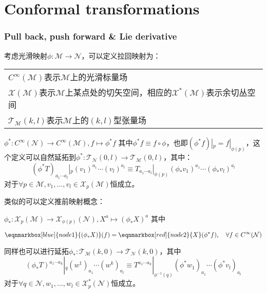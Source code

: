 \part{Conformal transformations}
\section{Pull back, push forward \& Lie derivative}
考虑光滑映射$\phi:\mathcal{M}\to\mathcal{N}$，可以定义拉回映射为：
\begin{margintable}\footnotesize 
	\begin{tabularx}{\marginparwidth}{|X}
		$C^{\infty}(\mathcal{M})$表示$\mathcal{M}$上的光滑标量场\\
		$\mathscr{X}(\mathcal{M})$表示$\mathcal{M}$上某点处的切矢空间，相应的$\mathscr{X}^*(\mathcal{M})$表示余切丛空间\\
		$\mathscr{T}_\mathcal{M}(k,l)$表示$\mathcal{M}$上的$(k,l)$型张量场
	\end{tabularx}
\end{margintable}
\begin{definition}
	$\phi^*: C^{\infty}(\mathcal{N})\to C^{\infty}(\mathcal{M}),f\mapsto \phi^*f$
	其中$\phi^*f\equiv f\circ\phi$，也即$(\phi^*f)|_p=f|_{\phi(p)}$，这个定义可以自然延拓到$\phi^*:\mathscr{T}_\mathcal{N}(0,l)\to\mathscr{T}_\mathcal{M}(0,l)$，其中：
	\begin{equation*}
		(\phi^*T)_{a_1\cdots a_l}|_p(v_1)^{a_1}\cdots (v_l)^{a_l}\equiv
		T_{a_1\cdots a_l}|_{\phi(p)}(\phi_*v_1)^{a_1}\cdots (\phi_*v_l)^{a_l}
	\end{equation*}
	对于$\forall p\in\mathcal{M},v_1,\ldots,v_l\in\mathscr{X}_p(\mathcal{M})$恒成立。
\end{definition}
类似的可以定义推前映射概念：
\begin{definition}
	$\phi_*: \mathscr{X}_p(\mathcal{M})\to \mathscr{X}_{\phi(p)}(\mathcal{N}),X^a\mapsto (\phi_*X)^a$
	其中
	
	\begin{equation*}
	\eqnmarkbox[blue]{node1}{(\phi_*X)}(f)=\eqnmarkbox[red]{node2}{X}(\phi^*f),\quad\forall f\in C^\infty(\mathcal{N})	
	\end{equation*}
	
	同样也可以进行延拓$\phi_*:\mathscr{T}_\mathcal{M}(k,0)\to\mathscr{T}_\mathcal{N}(k,0)$，其中
	\[
		(\phi_*T)^{a_1\cdots a_k}|_{q}(w^1)_{a_1}\cdots (w^k)_{a_l}\equiv
		T^{a_1\cdots a_k}|_{\phi^{-1}(q)}(\phi^*w_1)_{a_1}\cdots (\phi^*v_l)_{a_l}
	\]
	对于$\forall q\in\mathcal{N},w_1,\ldots,w_l\in\mathscr{X}^*_p(\mathcal{N})$恒成立。
\end{definition}

